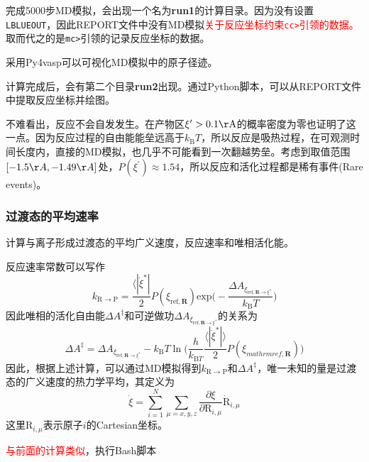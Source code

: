 完成5000步\textrm{MD}模拟，会出现一个名为\textbf{run1}的计算目录。因为没有设置\texttt{LBLUEOUT}，因此\textrm{REPORT}文件中没有\textrm{MD}模拟\textcolor{red}{关于反应坐标约束\texttt{cc>}引领的数据。}取而代之的是\texttt{mc>}引领的记录反应坐标的数据。

采用\textrm{Py4vasp}可以可视化\textrm{MD}模拟中的原子径迹。

计算完成后，会有第二个目录\textbf{run2}出现。通过\textrm{Python}脚本，可以从\textrm{REPORT}文件中提取反应坐标并绘图。

不难看出，反应不会自发发生。在产物区$\xi^{\prime}>0.1\mathrm{\AA}$的概率密度为零也证明了这一点。因为反应过程的自由能能垒远高于$k_{\mathrm{B}}T$，所以反应是吸热过程，在可观测时间长度内，直接的\textrm{MD}模拟，也几乎不可能看到一次翻越势垒。考虑到取值范围$[-1.5\AA,-1.49\AA]$处，$P(\xi^{\prime})\approx1.54$，所以反应和活化过程都是稀有事件\textrm{(Rare events)}。
\subsubsection{过渡态的平均速率}
计算与离子形成过渡态的平均广义速度，反应速率和唯相活化能。

反应速率常数可以写作
\begin{displaymath}
	k_{\mathrm{R}\rightarrow\mathrm{P}}=\dfrac{\langle|\dot{\xi}^{\ast}|}2P(\xi_{\mathrm{ref},\mathbf{R}})\mathrm{exp}\bigg(-\dfrac{\Delta A_{\xi_{\mathrm{ref},\mathbf{R}\rightarrow\xi^{\ast}}}}{k_{\mathrm{B}}T}\bigg)
\end{displaymath}
因此唯相的活化自由能$\Delta A^{\ddagger}$和可逆做功$\Delta A_{\xi_{\mathrm{ref},\mathbf{R}\rightarrow\xi^{\ast}}}$的关系为
\begin{displaymath}
	\Delta A^{\ddagger}=\Delta A_{\xi_{\mathrm{ref},\mathbf{R}\rightarrow\xi^{\ast}}}-k_{\mathrm{B}}T\ln\bigg(\dfrac{h}{k_{\mathrm{B}T}}\dfrac{\langle|\dot{\xi}^{\ast}|\rangle}2P(\xi_{mathrm{ref},\mathbf{R}})\bigg)
\end{displaymath}
因此，根据上述计算，可以通过\textrm{MD}模拟得到$k_{\mathrm{R}\rightarrow\mathrm{P}}$和$\Delta A^{\ddagger}$，唯一未知的量是过渡态的广义速度的热力学平均，其定义为
\begin{displaymath}
	\dot{\xi}=\sum_{i=1}^N\sum_{\mu=x,y,z}\dfrac{\partial\xi}{\partial\mathrm{R}_{i,\mu}}\dot{\mathrm{R}}_{i,\mu}
\end{displaymath}
这里$\mathrm{R}_{i,\mu}$表示原子$i$的\textrm{Cartesian}坐标。

\textcolor{red}{与前面的计算类似}，执行\textrm{Bash}脚本

